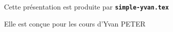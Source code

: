   \item Cette présentation est produite par \texttt{\textbf{simple-yvan.tex}}
  \item Elle est conçue pour les cours d'Yvan PETER
